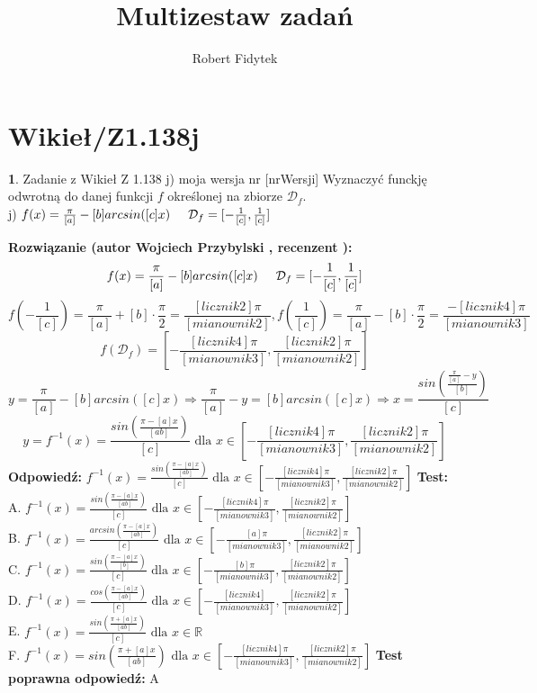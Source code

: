 \documentclass[12pt, a4paper]{article}
\title{Multizestaw zadań}
\author{Robert Fidytek}
\date{}
\theoremstyle{definition} %
\newtheorem{zad}{}
\newcommand{\kategoria}[1]{\section{#1}} %
\newcommand{\zadStart}[1]{\begin{zad}#1\newline} %
\newcommand{\zadStop}{\end{zad}}   %
\newcommand{\rozwStart}[2]{\noindent \textbf{Rozwiązanie (autor #1 , recenzent #2): }\newline} %
\newcommand{\rozwStop}{\newline}                                            %
\newcommand{\odpStart}{\noindent \textbf{Odpowiedź:}\newline}    %
\newcommand{\odpStop}{\newline}                                             %
\newcommand{\testStart}{\noindent \textbf{Test:}\newline} %
\newcommand{\testStop}{\newline} %
\newcommand{\kluczStart}{\noindent \textbf{Test poprawna odpowiedź:}\newline} %
\newcommand{\kluczStop}{\newline} %
\begin{document}
\maketitle


\kategoria{Wikieł/Z1.138j}
\zadStart{Zadanie z Wikieł Z 1.138 j) moja wersja nr [nrWersji]}
Wyznaczyć funckję odwrotną do danej funkcji $f$ określonej na zbiorze $\mathcal{D}_{f}$.\\
j) $f(x)=\frac{\pi}{[a]}-[b]arcsin([c]x)\hspace{5mm}\mathcal{D}_{f}=[-\frac{1}{[c]},\frac{1}{[c]}]$
\zadStop
\rozwStart{Wojciech Przybylski}{}
$$f(x)=\frac{\pi}{[a]}-[b]arcsin([c]x)\hspace{5mm} \mathcal{D}_{f}=[-\frac{1}{[c]},\frac{1}{[c]}]$$
$$f(-\frac{1}{[c]})=\frac{\pi}{[a]}+[b]\cdot\frac{\pi}{2}=\frac{[licznik2]\pi}{[mianownik2]}, f(\frac{1}{[c]})=\frac{\pi}{[a]}-[b]\cdot\frac{\pi}{2}=\frac{-[licznik4]\pi}{[mianownik3]}$$
$$f(\mathcal{D}_{f})=[-\frac{[licznik4]\pi}{[mianownik3]},\frac{[licznik2]\pi}{[mianownik2]}]$$
$$y=\frac{\pi}{[a]}-[b]arcsin([c]x)\Rightarrow \frac{\pi}{[a]}-y=[b]arcsin([c]x) \Rightarrow x=\frac{sin(\frac{\frac{\pi}{[a]}-y}{[b]})}{[c]}$$
$$y=f^{-1}(x)=\frac{sin(\frac{\pi-[a]x}{[ab]})}{[c]} \mbox{ dla } x\in [-\frac{[licznik4]\pi}{[mianownik3]},\frac{[licznik2]\pi}{[mianownik2]}]$$
\rozwStop
\odpStart
$f^{-1}(x)=\frac{sin(\frac{\pi-[a]x}{[ab]})}{[c]} \mbox{ dla } x\in [-\frac{[licznik4]\pi}{[mianownik3]},\frac{[licznik2]\pi}{[mianownik2]}]$
\odpStop
\testStart
A. $f^{-1}(x)=\frac{sin(\frac{\pi-[a]x}{[ab]})}{[c]} \mbox{ dla } x\in [-\frac{[licznik4]\pi}{[mianownik3]},\frac{[licznik2]\pi}{[mianownik2]}]$\\
B. $f^{-1}(x)=\frac{arcsin(\frac{\pi-[a]x}{[ab]})}{[c]} \mbox{ dla } x\in [-\frac{[a]\pi}{[mianownik3]},\frac{[licznik2]\pi}{[mianownik2]}]$\\
C. $f^{-1}(x)=\frac{sin(\frac{\pi-[a]x}{[b]})}{[c]} \mbox{ dla } x\in [-\frac{[b]\pi}{[mianownik3]},\frac{[licznik2]\pi}{[mianownik2]}]$\\
D. $f^{-1}(x)=\frac{cos(\frac{\pi-[a]x}{[ab]})}{[c]} \mbox{ dla } x\in [-\frac{[licznik4]}{[mianownik3]},\frac{[licznik2]\pi}{[mianownik2]}]$\\
E. $f^{-1}(x)=\frac{sin(\frac{\pi+[a]x}{[ab]})}{[c]} \mbox{ dla } x\in \mathbb{R}$\\
F. $f^{-1}(x)=sin(\frac{\pi+[a]x}{[ab]}) \mbox{ dla } x\in [-\frac{[licznik4]\pi}{[mianownik3]},\frac{[licznik2]\pi}{[mianownik2]}]$
\testStop
\kluczStart
A
\kluczStop
\end{document}
